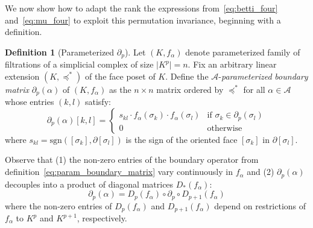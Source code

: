 \documentclass[10pt]{article}
\numberwithin{equation}{section}
\newcommand{\+}{%
	\raisebox{0.18ex}{\scaleobj{0.55}{+}}
}
\theoremstyle{definition}
\newtheorem{definition}{Definition}
\theoremstyle{definition}
\begin{document}
We now show how to adapt the rank  the expressions from~\eqref{eq:betti_four} and~\eqref{eq:mu_four} to exploit this permutation invariance, beginning with a definition.
\begin{definition}[Parameterized $\partial_p$]\label{def:time_boundary_matrix}
Let $(K, f_\alpha)$ denote parameterized family of filtrations of a simplicial complex of size $\lvert K^p \rvert = n$. Fix an arbitrary linear extension $(K, \preceq^\ast)$ of the face poset of $K$. Define the $\mathcal{A}$-\emph{parameterized} \emph{boundary matrix} $\partial_p(\alpha)$ of $(K, f_\alpha)$ as the $n \times n$ matrix ordered by $\preceq^\ast$ for all $\alpha \in \mathcal{A}$ whose entries $(k,l)$ satisfy:
\begin{equation}\label{eq:param_boundary_matrix}
	\partial_p(\alpha)[k,l] = \begin{cases}
s_{kl} \cdot f_\alpha(\sigma_k) \cdot f_\alpha(\sigma_l) & \text{if } \sigma_k \in \partial_p(\sigma_l)\\
	0 & \text{otherwise}
\end{cases}
\end{equation}
where $s_{kl} = \mathrm{sgn}([\sigma_k], \partial [\sigma_l])$ is the sign of the oriented face $[\sigma_k]$ in $\partial[\sigma_l]$.
\end{definition}
\noindent
Observe that (1) the non-zero entries of the boundary operator from definition~\ref{eq:param_boundary_matrix} vary continuously in $f_\alpha$ and (2) $\partial_p(\alpha)$ decouples into a product of diagonal matrices $D_\ast(f_\alpha)$: 
	\begin{equation}\label{eq:decouple}
		\partial_p(\alpha) = D_p(f_\alpha) \circ \partial_p \circ D_{p+1}(f_\alpha) 
	\end{equation}
	where the non-zero entries of $D_p(f_\alpha)$ and  $D_{p+1}(f_\alpha)$ depend on restrictions of $f_\alpha$ to $K^p$ and $K^{p+1}$, respectively.
\end{document}

